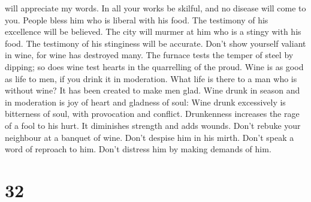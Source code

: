 will appreciate my words. In all your works be skilful, and no disease
will come to you.  People bless him who is liberal with his
food. The testimony of his excellence will be believed. 
The city will murmer at him who is a stingy with his food. The testimony
of his stinginess will be accurate.  Don't show yourself
valiant in wine, for wine has destroyed many.  The furnace
tests the temper of steel by dipping; so does wine test hearts in the
quarrelling of the proud.  Wine is as good as life to men,
if you drink it in moderation. What life is there to a man who is
without wine? It has been created to make men glad.  Wine
drunk in season and in moderation is joy of heart and gladness of soul:
 Wine drunk excessively is bitterness of soul, with
provocation and conflict.  Drunkenness increases the rage
of a fool to his hurt. It diminishes strength and adds wounds.
 Don't rebuke your neighbour at a banquet of wine. Don't
despise him in his mirth. Don't speak a word of reproach to him. Don't
distress him by making demands of him.

\hypertarget{section-27}{%
\section{32}\label{section-27}}

